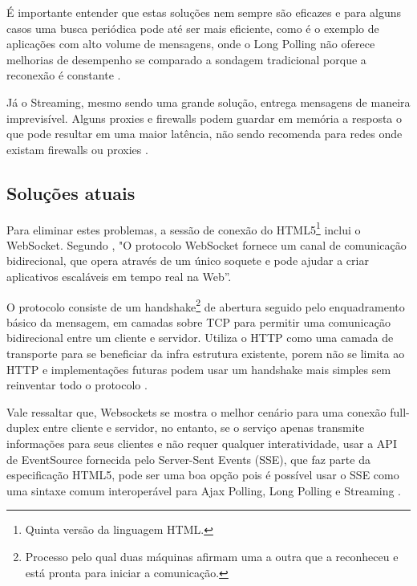 É importante entender que estas soluções nem sempre são eficazes e para alguns casos uma busca periódica pode até ser mais eficiente, como é o exemplo de aplicações com alto volume de mensagens, onde o Long Polling não oferece melhorias de desempenho se comparado a sondagem tradicional porque a reconexão é constante \cite{Wang2013}.

Já o Streaming, mesmo sendo uma grande solução, entrega mensagens de maneira imprevisível. Alguns proxies e firewalls podem guardar em memória a resposta o que pode resultar em uma maior latência, não sendo recomenda para redes onde existam firewalls ou proxies \cite[p.~6]{Wang2013}.

\subsection{Soluções atuais}

Para eliminar estes problemas, a sessão de conexão do HTML5\footnote{Quinta versão da linguagem HTML.} inclui o WebSocket. Segundo , "O protocolo WebSocket fornece um canal de comunicação bidirecional, que opera através de um único soquete e pode ajudar a criar aplicativos escaláveis em tempo real na Web”.

O protocolo consiste de um handshake\footnote{Processo pelo qual duas máquinas afirmam uma a outra que a reconheceu e está pronta para iniciar a comunicação.} de abertura seguido pelo enquadramento básico da mensagem, em camadas sobre TCP para permitir uma comunicação bidirecional entre um cliente e servidor. Utiliza o HTTP como uma camada de transporte para se beneficiar da infra estrutura existente, porem não se limita ao HTTP e implementações futuras podem usar um handshake mais simples sem reinventar todo o protocolo \cite{Saint-Andre2011}.

Vale ressaltar que, Websockets se mostra o melhor cenário para uma conexão full-duplex entre cliente e servidor, no entanto, se o serviço apenas transmite informações para seus clientes e não requer qualquer interatividade, usar a API de EventSource fornecida pelo Server-Sent Events (SSE), que faz parte da especificação HTML5, pode ser uma boa opção pois é possível usar o SSE como uma sintaxe comum interoperável para Ajax Polling, Long Polling e Streaming \cite[p.~10-11]{Wang2013}.